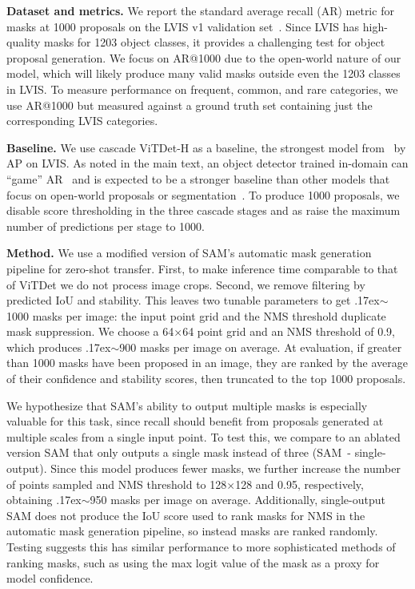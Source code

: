 \documentclass[10pt,twocolumn,letterpaper]{article}
\renewcommand{\paragraph}[1]{\vspace{1.25mm}\noindent\textbf{#1}}
\newcommand{\app}{\raise.17ex\hbox{$\scriptstyle\sim$}}
\newcommand{\x}{{\times}}
\newcommand{\sam}{SAM\xspace}
\begin{document}
\paragraph{Dataset and metrics.} We report the standard average recall (AR) metric for masks at 1000 proposals on the LVIS v1 validation set~\cite{Gupta2019}. Since LVIS has high-quality masks for 1203 object classes, it provides a challenging test for object proposal generation. We focus on AR@1000 due to the open-world nature of our model, which will likely produce many valid masks outside even the 1203 classes in LVIS. To measure performance on frequent, common, and rare categories, we use AR@1000 but measured against a ground truth set containing just the corresponding LVIS categories.

\paragraph{Baseline.} We use cascade ViTDet-H as a baseline, the strongest model from~\cite{li2022exploring} by AP on LVIS. As noted in the main text, an object detector trained in-domain can ``game'' AR~\cite{chavali2016object} and is expected to be a stronger baseline than other models that focus on open-world proposals or segmentation~\cite{kim2022learning,wang2022open}. To produce 1000 proposals, we disable score thresholding in the three cascade stages and as raise the maximum number of predictions per stage to 1000.

\paragraph{Method.} We use a modified version of \sam's automatic mask generation pipeline for zero-shot transfer. First, to make inference time comparable to that of ViTDet we do not process image crops. Second, we remove filtering by predicted IoU and stability. This leaves two tunable parameters to get \app1000 masks per image: the input point grid and the NMS threshold duplicate mask suppression. We choose a 64$\x$64 point grid and an NMS threshold of 0.9, which produces \app900 masks per image on average. At evaluation, if greater than 1000 masks have been proposed in an image, they are ranked by the average of their confidence and stability scores, then truncated to the top 1000 proposals.

We hypothesize that \sam's ability to output multiple masks is especially valuable for this task, since recall should benefit from proposals generated at multiple scales from a single input point. To test this, we compare to an ablated version \sam that only outputs a single mask instead of three (\sam\ - single-output). Since this model produces fewer masks, we further increase the number of points sampled and NMS threshold to 128$\x$128 and 0.95, respectively, obtaining \app950 masks per image on average. Additionally, single-output \sam does not produce the IoU score used to rank masks for NMS in the automatic mask generation pipeline, so instead masks are ranked randomly. Testing suggests this has similar performance to more sophisticated methods of ranking masks, such as using the max logit value of the mask as a proxy for model confidence.
\end{document}
